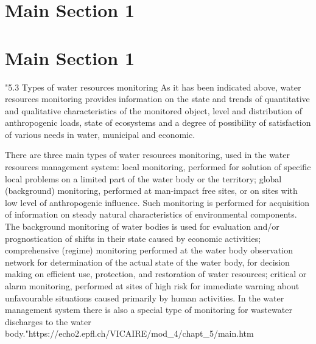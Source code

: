 \section{Main Section 1}


\section{Main Section 1}




"5.3 Types of water resources monitoring
As it has been indicated above, water resources monitoring provides information on the state and trends of quantitative and qualitative characteristics of the monitored object, level and distribution of anthropogenic loads, state of ecosystems and a degree of possibility of satisfaction of various needs in water, municipal and economic.

There are three main types of water resources monitoring, used in the water resources management system:
local monitoring, performed for solution of specific local problems on a limited part of the water body or the territory;
global (background) monitoring, performed at man-impact free sites, or on sites with low level of anthropogenic influence. Such monitoring is performed for acquisition of information on steady natural characteristics of environmental components. The background monitoring of water bodies is used for evaluation and/or prognostication of shifts in their state caused by economic activities;
comprehensive (regime) monitoring performed at the water body observation network for determination of the actual state of the water body, for decision making on efficient use, protection, and restoration of water resources;
critical or alarm monitoring, performed at sites of high risk for immediate warning about unfavourable situations caused primarily by human activities.
In the water management system there is also a special type of monitoring for wastewater discharges to the water body."https://echo2.epfl.ch/VICAIRE/mod_4/chapt_5/main.htm

